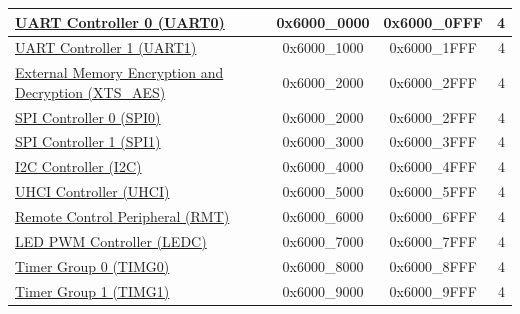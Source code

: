 \begin{ThreePartTable}
\begin{longtable}[c]{ |p{7cm}|c|c|r| }
    \hyperref[mod:uart]{UART Controller 0 (UART0)}           & 0x6000\_0000 & 0x6000\_0FFF &   4\\\hline
    \hyperref[mod:uart]{UART Controller 1 (UART1)}           & 0x6000\_1000 & 0x6000\_1FFF &   4\\\hline
    \hyperref[mod:extmemencr]{External Memory Encryption and Decryption (XTS\_AES)} \tnote{\textcolor{red}{1}}           & 0x6000\_2000 & 0x6000\_2FFF &   4\\\hline
    \hyperref[mod:spi]{SPI Controller 0 (SPI0)}  \tnote{\textcolor{red}{1}}          & 0x6000\_2000 & 0x6000\_2FFF &   4\\\hline
    \hyperref[mod:spi]{SPI Controller 1 (SPI1)}            & 0x6000\_3000 & 0x6000\_3FFF &   4\\\hline
    \hyperref[mod:i2c]{I2C Controller (I2C)}            & 0x6000\_4000 & 0x6000\_4FFF &   4 \\\hline
    \hyperref[mod:uart]{UHCI Controller (UHCI)}                       & 0x6000\_5000 & 0x6000\_5FFF &   4     \\\hline
    \hyperref[mod:rmt]{Remote Control Peripheral (RMT)} & 0x6000\_6000 & 0x6000\_6FFF &   4     \\\hline
    \hyperref[mod:ledpwm]{LED PWM Controller (LEDC)}& 0x6000\_7000 & 0x6000\_7FFF &   4     \\\hline
    \hyperref[mod:timg]{Timer Group 0 (TIMG0)}               & 0x6000\_8000 & 0x6000\_8FFF &   4     \\\hline
    \hyperref[mod:timg]{Timer Group 1 (TIMG1)}               & 0x6000\_9000 & 0x6000\_9FFF &   4     \\\hline
                    

\end{longtable}
\end{ThreePartTable}
